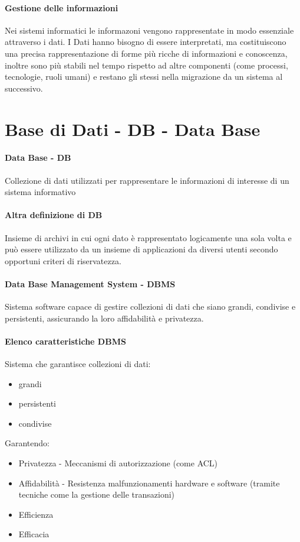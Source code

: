\paragraph*{Gestione delle informazioni}
Nei sistemi informatici le informazoni vengono rappresentate in modo essenziale
attraverso i dati.
I Dati hanno bisogno di essere interpretati, ma costituiscono una precisa rappresentazione
di forme più ricche di informazioni e conoscenza, inoltre sono più stabili nel tempo rispetto
ad altre componenti (come processi, tecnologie, ruoli umani) e restano gli stessi
nella migrazione da un sistema al successivo.
\section{Base di Dati - DB - Data Base}
\paragraph*{Data Base - DB} Collezione di dati utilizzati per rappresentare le
informazioni di interesse di un sistema informativo
\paragraph*{Altra definizione di DB} Insieme di archivi in cui ogni dato è rappresentato
logicamente una sola volta e può essere utilizzato da un insieme di applicazioni da
diversi utenti secondo opportuni criteri di riservatezza.
\paragraph*{Data Base Management System - DBMS} Sistema software capace di
gestire collezioni di dati che siano grandi, condivise e persistenti, assicurando la loro affidabilità
 e privatezza.
\paragraph*{Elenco caratteristiche DBMS} Sistema che garantisce collezioni di dati:
\begin{itemize}
    \item grandi
    \item persistenti
    \item condivise
\end{itemize}
Garantendo:
\begin{itemize}
    \item Privatezza - Meccanismi di autorizzazione (come ACL)
    \item Affidabilità - Resistenza malfunzionamenti hardware e software
    (tramite tecniche come la gestione delle transazioni)
    \item Efficienza
    \item Efficacia
\end{itemize}
